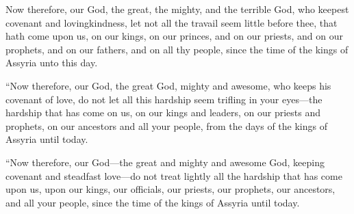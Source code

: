 			\begin{versebox}
					\item[BHS] 
					\item[LXX] 
					\item[ASV] Now therefore, our God, the great, the mighty, and the terrible God, who keepest covenant and lovingkindness, let not all the travail seem little before thee, that hath come upon us, on our kings, on our princes, and on our priests, and on our prophets, and on our fathers, and on all thy people, since the time of the kings of Assyria unto this day.
					\item[NIV] “Now therefore, our God, the great God, mighty and awesome, who keeps his covenant of love, do not let all this hardship seem trifling in your eyes—the hardship that has come on us, on our kings and leaders, on our priests and prophets, on our ancestors and all your people, from the days of the kings of Assyria until today.
					\item[NRSV] “Now therefore, our God—the great and mighty and awesome God, keeping covenant and steadfast love—do not treat lightly all the hardship that has come upon us, upon our kings, our officials, our priests, our prophets, our ancestors, and all your people, since the time of the kings of Assyria until today.
			\end{versebox}

